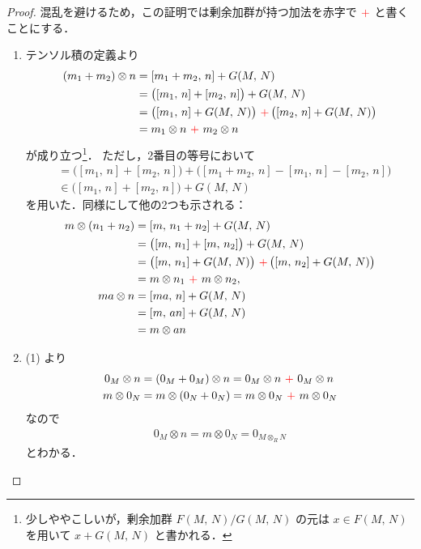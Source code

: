 \documentclass[algtopo_main]{subfiles}
\begin{document}
\begin{proof}
	混乱を避けるため，この証明では剰余加群が持つ加法を赤字で $\textcolor{red}{+}$ と書くことにする．
	\begin{enumerate}
		\item テンソル積の定義より
		\begin{align}
			(m_1 + m_2) \otimes n &= [m_1 + m_2,\, n] + G(M,\, N) \\
			&= \bigl([m_1,\, n] + [m_2,\, n]\bigr) + G(M,\, N) \\
			&= \bigl( [m_1,\, n] + G(M,\, N) \bigr)\mathop{}\textcolor{red}{+}\mathop{} \bigl( [m_2,\, n] + G(M,\, N) \bigr) \\
			&= m_1 \otimes n \mathop{}\textcolor{red}{+}\mathop{} m_2 \otimes n
		\end{align}
		が成り立つ\footnote{少しややこしいが，剰余加群 $F(M,\, N)/G(M,\, N)$ の元は $x \in F(M,\, N)$ を用いて $x + G(M,\, N)$ と書かれる．}．
		ただし，2番目の等号において
		\begin{align}
			[m_1 + m_2,\, n] &= \bigl([m_1,\, n] + [m_2,\, n]\bigr) + \bigl([m_1 + m_2,\, n] - [m_1,\, n] - [m_2,\, n]\bigr) \\
			&\in \bigl([m_1,\, n] + [m_2,\, n]\bigr) + G(M,\, N)
		\end{align}
		を用いた．同様にして他の2つも示される：
		\begin{align}
			m \otimes (n_1 + n_2) &= [m,\, n_1 + n_2] + G(M,\, N) \\
			&= \bigl([m,\, n_1] + [m,\, n_2]\bigr) + G(M,\, N) \\
			&= \bigl( [m,\, n_1] + G(M,\, N) \bigr) \mathop{}\textcolor{red}{+}\mathop{} \bigl( [m,\, n_2] + G(M,\, N) \bigr) \\
			&= m \otimes n_1 \mathop{}\textcolor{red}{+}\mathop{} m \otimes n_2, \\
			ma \otimes n &= [ma,\, n] + G(M,\, N) \\
			&= [m,\, an] + G(M,\, N) \\
			&= m \otimes an
		\end{align}
		\item (1) より
		\begin{align}
			0_M \otimes n &= (0_M + 0_M) \otimes n = 0_M \otimes n  \mathop{}\textcolor{red}{+}\mathop{}  0_M \otimes n \\
			m \otimes 0_N &= m \otimes (0_N + 0_N) = m \otimes 0_N  \mathop{}\textcolor{red}{+}\mathop{}  m \otimes 0_N
		\end{align}
		なので
		\begin{align}
			0_M \otimes n = m \otimes 0_N = 0_{M \otimes_R N}
		\end{align}
		とわかる．
	\end{enumerate}
\end{proof}
\end{document}
